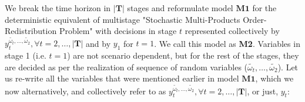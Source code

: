 \documentclass[11pt,letter]{article}
\begin{document}
We break the time horizon in $|\textbf{T}|$ stages and reformulate model $\textbf{M1}$ for the deterministic equivalent of multistage "Stochastic Multi-Products Order-Redistribution Problem" with decisions in stage $t$ represented collectively by $y_t^{\tilde{\omega_t},\ldots ,\tilde{\omega_2}}, \forall t=2,\ldots ,|\textbf{T}|$ and by $y_1$ for $t=1$. We call this model as \textbf{M2}. Variables in stage 1 (i.e. $t=1$) are not scenario dependent, but for the rest of the stages, they are decided as per the realization of sequence of random variables ($\tilde{\omega_t},\ldots ,\tilde{\omega_2}$). Let us re-write all the variables that were mentioned earlier in model $\textbf{M1}$, which we now alternatively, and collectively refer to as $y_t^{\tilde{\omega_t},\ldots ,\tilde{\omega_2}}, \forall t=2,\ldots ,|\textbf{T}|$, or just, $y_t$: \\
\end{document}
